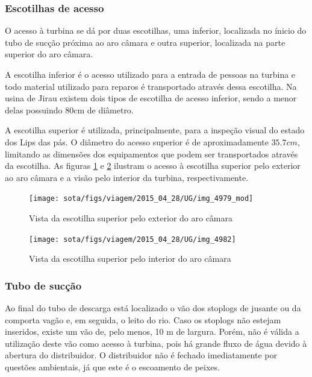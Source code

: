  
\subsubsection{Escotilhas de acesso}
O acesso à turbina se dá por duas escotilhas, uma inferior, localizada no ínicio do tubo de sucção 
próxima ao aro câmara e outra superior, localizada na parte superior do aro câmara.

A escotilha inferior é o acesso utilizado para a entrada de pessoas na turbina e todo 
material utilizado para reparos é transportado através dessa escotilha. Na usina de Jirau existem dois 
tipos de escotilha de acesso inferior, sendo a menor delas possuindo 80cm de diâmetro. 

A escotilha superior é utilizada, principalmente, para a inspeção visual do
estado dos Lips das pás.
O diâmetro do acesso superior é de aproximadamente $35.7cm$, limitando as
dimensões dos equipamentos que podem ser transportados através da escotilha. As figuras \ref{fig::esc_sup_ext} e
\ref{fig::esc_sup_int} ilustram o acesso à escotilha superior pelo exterior ao
aro câmara e a visão pelo interior da turbina,
respectivamente.

\begin{figure}[h!]	
	\texttt{[image: sota/figs/viagem/2015\_04\_28/UG/img\_4979\_mod]}
	\caption{Vista da escotilha superior pelo exterior do aro câmara}
	\label{fig::esc_sup_ext}
\end{figure}

\begin{figure}[h!]	
	\texttt{[image: sota/figs/viagem/2015\_04\_28/UG/img\_4982]}
	\caption{Vista da escotilha superior pelo interior do aro câmara}
	\label{fig::esc_sup_int}
\end{figure}

\subsubsection{Tubo de sucção}

Ao final do tubo de descarga está localizado o vão dos stoplogs 
de jusante ou da comporta vagão e, em seguida, o leito do rio. Caso os stoplogs 
não estejam inseridos, existe um vão de, pelo menos, 10 m de largura. Porém, não
é válida a utilização deste vão como acesso à turbina, pois há grande fluxo de
água devido à abertura do distribuidor. O distribuidor não é fechado
imediatamente por questões ambientais, já que este é o escoamento de peixes.


